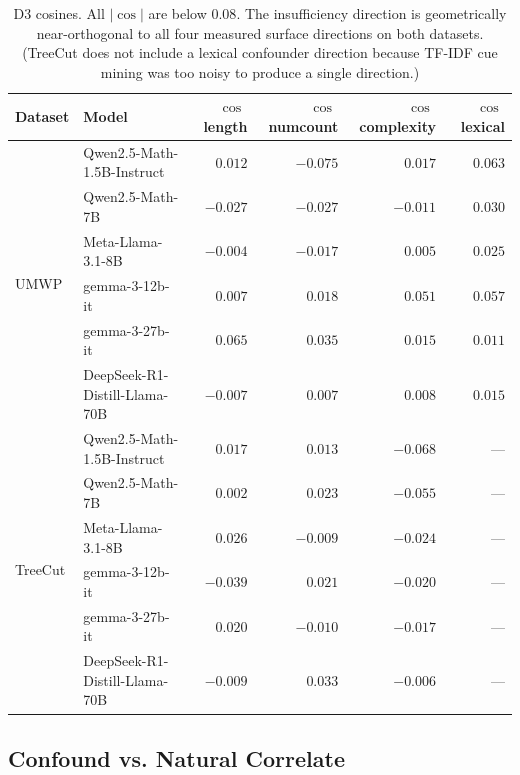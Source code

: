 \begin{table}[h]
\centering
\small
\caption{D3 cosines. All $|\cos|$ are below $0.08$. The insufficiency
direction is geometrically near-orthogonal to all four measured surface
directions on both datasets. (TreeCut does not include a lexical
confounder direction because TF-IDF cue mining was too noisy to
produce a single direction.)}
\label{tab:d3}
\begin{tabular}{llrrrr}
\toprule
Dataset & Model
   & $\cos$\,length
   & $\cos$\,numcount
   & $\cos$\,complexity
   & $\cos$\,lexical \\
\midrule
\multirow{6}{*}{UMWP}
 & Qwen2.5-Math-1.5B-Instruct      & $\phantom{-}0.012$ & $-0.075$ & $\phantom{-}0.017$ & $\phantom{-}0.063$ \\
 & Qwen2.5-Math-7B                 & $-0.027$ & $-0.027$ & $-0.011$ & $\phantom{-}0.030$ \\
 & Meta-Llama-3.1-8B               & $-0.004$ & $-0.017$ & $\phantom{-}0.005$ & $\phantom{-}0.025$ \\
 & gemma-3-12b-it                  & $\phantom{-}0.007$ & $\phantom{-}0.018$ & $\phantom{-}0.051$ & $\phantom{-}0.057$ \\
 & gemma-3-27b-it                  & $\phantom{-}0.065$ & $\phantom{-}0.035$ & $\phantom{-}0.015$ & $\phantom{-}0.011$ \\
 & DeepSeek-R1-Distill-Llama-70B   & $-0.007$ & $\phantom{-}0.007$ & $\phantom{-}0.008$ & $\phantom{-}0.015$ \\
\midrule
\multirow{6}{*}{TreeCut}
 & Qwen2.5-Math-1.5B-Instruct      & $\phantom{-}0.017$ & $\phantom{-}0.013$ & $-0.068$ & --- \\
 & Qwen2.5-Math-7B                 & $\phantom{-}0.002$ & $\phantom{-}0.023$ & $-0.055$ & --- \\
 & Meta-Llama-3.1-8B               & $\phantom{-}0.026$ & $-0.009$ & $-0.024$ & --- \\
 & gemma-3-12b-it                  & $-0.039$ & $\phantom{-}0.021$ & $-0.020$ & --- \\
 & gemma-3-27b-it                  & $\phantom{-}0.020$ & $-0.010$ & $-0.017$ & --- \\
 & DeepSeek-R1-Distill-Llama-70B   & $-0.009$ & $\phantom{-}0.033$ & $-0.006$ & --- \\
\bottomrule
\end{tabular}
\end{table}

\subsection{Confound vs. Natural Correlate}
\label{sec:reframe}


